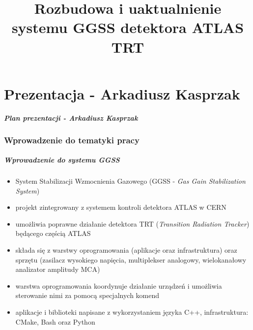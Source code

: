 \documentclass[10pt]{beamer}
\title{Rozbudowa i uaktualnienie systemu GGSS detektora ATLAS TRT}
\author{\normalsize{Arkadiusz Kasprzak \newline \and 
    Jarosław Cierpich \newline \newline \and 
    Opiekun pracy: dr hab. inż. Bartosz Mindur, prof. AGH}}
\date{}
\begin{document}
\renewcommand{\figurename}{Rysunek}

\titleframe[pl]

\part{Prezentacja - Arkadiusz Kasprzak}

\begin{frame}
\frametitle{Plan prezentacji - Arkadiusz Kasprzak}
\tableofcontents
\end{frame}


\section{Wprowadzenie do tematyki pracy}

\begin{frame}
\frametitle{Wprowadzenie do systemu GGSS}
\begin{itemize}
    \item System Stabilizacji Wzmocnienia Gazowego (GGSS - \emph{Gas Gain Stabilization System})
    \item projekt zintegrowany z systemem kontroli detektora ATLAS w CERN
    \item umożliwia poprawne działanie detektora TRT (\emph{Transition Radiation Tracker}) będącego częścią ATLAS
    \item składa się z warstwy oprogramowania (aplikacje oraz infrastruktura) oraz sprzętu (zasilacz wysokiego napięcia, multiplekser analogowy, wielokanałowy analizator amplitudy MCA)
    \item warstwa oprogramowania koordynuje działanie urządzeń i umożliwia sterowanie nimi za pomocą specjalnych komend
    \item aplikacje i biblioteki napisane z wykorzystaniem języka C++, infrastruktura: CMake, Bash oraz Python
\end{itemize}
\end{frame}
\end{document}
